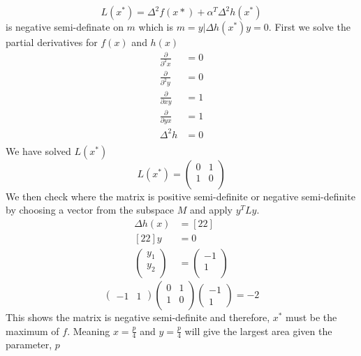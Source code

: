 \begin{equation}
L(x^*) = \Delta^2f(x*) + \alpha^T\Delta^2h(x^*)
\end{equation}
is negative semi-definate on $m$ which is $m = {y | \Delta h (x^*) y = 0}$. First we solve the partial derivatives for $f(x)$ and $h(x)$
\begin{equation*}
\begin{aligned}
\frac{\partial}{\partial^2 x} &= 0\\
\frac{\partial}{\partial^2 y} &= 0\\
\frac{\partial}{\partial xy} &= 1\\
\frac{\partial}{\partial yx} &= 1\\
\Delta^2 h &= 0\\
\end{aligned}
\end{equation*}
We have solved $L(x^*)$
\begin{equation*}
L(x^*) = 
\begin{pmatrix}
0 &1\\
1 &0\\
\end{pmatrix}
\end{equation*}
We then check where the matrix is positive semi-definite or negative semi-definite by choosing a vector from the subspace $M$ and apply $y^TLy$.
\begin{equation}
\begin{aligned}
\Delta h(x) &= [2 2]\\
[2 2]y &= 0\\
\begin{pmatrix}
y_1\\
y_2 \\
\end{pmatrix}
& = 
\begin{pmatrix}
-1 \\
1 \\
\end{pmatrix}
\end{aligned}
\end{equation} 
\begin{equation}
\begin{pmatrix}
-1 & 1 
\end{pmatrix}
\begin{pmatrix}
0 & 1 \\
1 & 0\\
\end{pmatrix}
\begin{pmatrix}
-1 \\
1
\end{pmatrix}
= -2
\end{equation}
This shows the matrix is negative semi-definite and therefore, $x^*$ must be the maximum of $f$. Meaning $x=\frac{p}{4}$ and $y=\frac{p}{4}$ will give the largest area given the parameter, $p$
